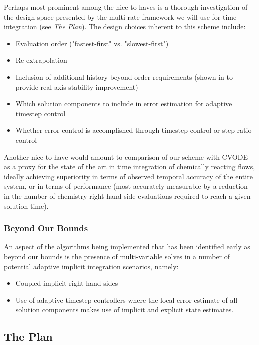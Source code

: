 Perhaps most prominent among the nice-to-haves is a thorough investigation of
the design space presented by the multi-rate framework we will use for time
integration (see \emph{The Plan}). The design choices inherent to this
scheme include:
\begin{itemize}
\item{Evaluation order ("fastest-first" vs. "slowest-first")}
\item{Re-extrapolation}
\item{Inclusion of additional history beyond order requirements (shown in \cite{mikida2019multi} to provide real-axis stability improvement)}
\item{Which solution components to include in error estimation for adaptive timestep
      control}
\item{Whether error control is accomplished through timestep control or step ratio control}
\end{itemize}
Another nice-to-have would amount to comparison of our scheme with CVODE as
a proxy for the state of the art in time integration of chemically reacting
flows, ideally achieving superiority in terms of observed temporal accuracy
of the entire system, or in terms of performance (most accurately measurable
by a reduction in the number of chemistry right-hand-side evaluations required
to reach a given solution time).

\subsubsection{Beyond Our Bounds}

An aspect of the algorithms being implemented that has been identified early
as beyond our bounds is the presence of multi-variable solves in a number of
potential adaptive implicit integration scenarios, namely:
\begin{itemize}
\item{Coupled implicit right-hand-sides}
\item{Use of adaptive timestep controllers where the local error estimate
      of all solution components makes use of implicit and explicit state
      estimates.}
\end{itemize}

\subsection{The Plan}

